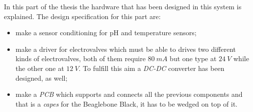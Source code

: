 In this part of the thesis the hardware that has been designed in this system is explained. 
The design specification for this part are:
\begin{itemize}
	\item make a sensor conditioning for pH and temperature sensors;
	\item make a driver for electrovalves which must be able to drives two different kinds of electrovalves, both of them require $80\ mA$ but one type at $24\ V$ while the other one at $12\ V$. To fulfill this aim a \textit{DC-DC} converter has been designed, as well;
	\item make a \textit{PCB}  which supports and connects all the previous components and that is a \textit{capes} for the Beaglebone Black,  it has to be wedged on top of it.
\end{itemize}